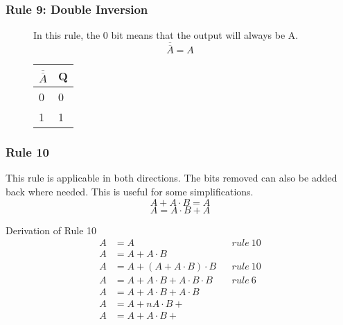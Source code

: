 \subsubsection*{Rule 9: Double Inversion}
\begin{figure}[H]
    \begin{minipage}[t]{0.65\textwidth}
        In this rule, the 0 bit means that the output will always be A.
        \[\overline{\overline{A}} = A\]
    \end{minipage}\hfill
    \begin{minipage}[t]{0.25\textwidth}
        \begin{table}[H]
            \begin{tabularx}{0.5\textwidth}{X|X}
                $\overline{\overline{A}}$ & Q\\
                \hline
                0 & 0\\
                1 & 1\\
            \end{tabularx}
        \end{table}
    \end{minipage}\hfill
\end{figure}

\subsubsection*{Rule 10}
This rule is applicable in both directions. The bits removed can also be added back where needed. This is useful for some simplifications.
\[A + A\cdot B = A\]
\[A = A \cdot B  + A \]
\begin{example}{Derivation of Rule 10}
\begin{align*}
A &= A && rule\ 10\\
A &= A + A \cdot B\\
A &= A + (A+A\cdot B)\cdot B && rule\ 10\\
A &= A + A\cdot B + A \cdot B \cdot B && rule\ 6\\
A &= A + A \cdot B + A \cdot B\\
A &= A + nA \cdot B +\\
A &= A + A \cdot B +
\end{align*}
\end{example}

